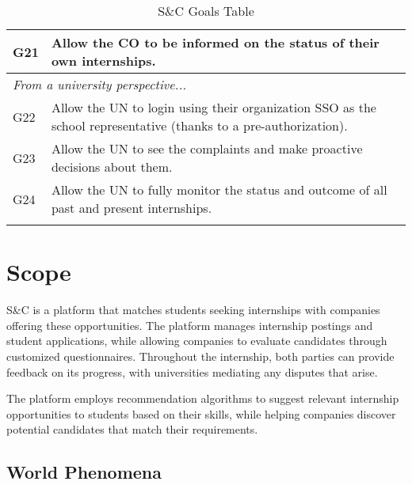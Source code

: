 \begin{longtable}{|l|p{}|}
    \hline
    G21           & Allow the CO to be informed on the status of their own internships.                                                                               \\
    \hline \hline
    \multicolumn{2}{|l|}{\textit{From a university perspective...}}                                                                                                   \\
    \hline
    G22           & Allow the UN to login using their organization SSO as the school representative (thanks to a pre-authorization).                                  \\
    \hline
    G23           & Allow the UN to see the complaints and make proactive decisions about them.                                                                       \\
    \hline
    G24           & Allow the UN to fully monitor the status and outcome of all past and present internships.                                                         \\
    \hline
    \caption{S\&C Goals Table}
    \label{tab:goals}
\end{longtable}

\section{Scope}
\label{sec:scope}%

\par S\&C is a platform that matches students seeking internships with companies offering these opportunities. The
platform manages internship postings and student applications, while allowing companies to evaluate candidates through
customized questionnaires. Throughout the internship, both parties can provide feedback on its progress, with
universities mediating any disputes that arise.

\par The platform employs recommendation algorithms to suggest relevant internship opportunities to students based on
their skills, while helping companies discover potential candidates that match their requirements.

\subsection{World Phenomena}
\label{subsec:world-phenomena}%

